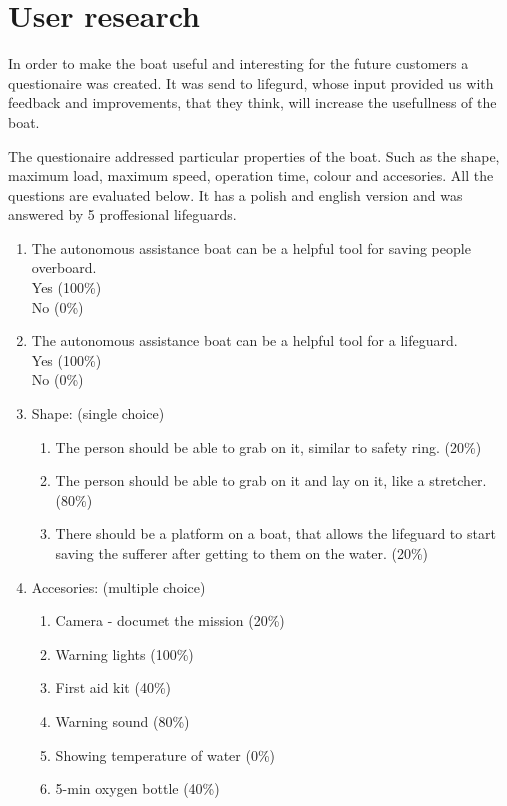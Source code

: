 \section {User research}
In order to make the boat useful and interesting for the future customers a questionaire was created. 
It was send to lifegurd, whose input provided us with feedback and improvements, that they think,
will increase the usefullness of the boat.

The questionaire addressed particular properties of the boat. Such as the shape, maximum load,
maximum speed, operation time, colour and accesories. All the questions are evaluated below.
It has a polish and english version and was answered by 5 proffesional lifeguards.

\begin{enumerate}
    \item The autonomous assistance boat can be a helpful tool for saving people overboard.\\
            Yes (100\%)\\
            No (0\%)
    \item The autonomous assistance boat can be a helpful tool for a lifeguard.\\
        Yes (100\%)\\
        No (0\%)
    \item Shape: (single choice)
    \begin{enumerate}
        \item  The person should be able to grab on it, similar to safety ring. (20\%)
        \item  The person should be able to grab on it and lay on it, like a stretcher. (80\%)
        \item  There should be a platform on a boat, that allows the lifeguard to start saving the sufferer after getting to them on the water. (20\%)
    \end{enumerate}
    \item Accesories: (multiple choice)
    \begin{enumerate}
        \item Camera - documet the mission (20\%)
        \item Warning lights (100\%)
        \item First aid kit (40\%)
        \item Warning sound (80\%)
        \item Showing temperature of water (0\%)
        \item 5-min oxygen bottle (40\%)

\end{enumerate}
\end{enumerate}
